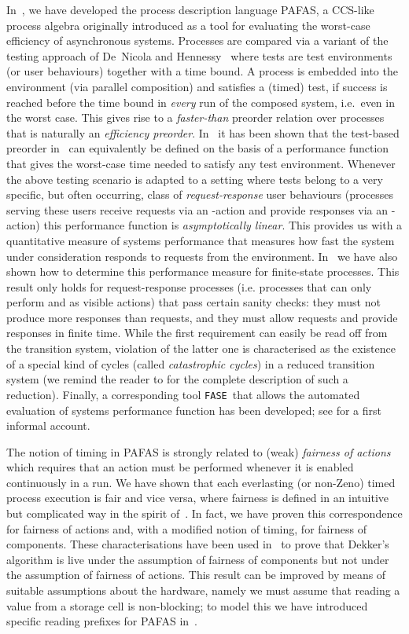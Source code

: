 \documentclass[copyright,creativecommons]{eptcs}
\newcommand{\fase}{\texttt{FASE}}
\begin{document}
In~\cite{CVJ02}, we have developed the process description language PAFAS,
a CCS-like~\cite{Mil89} process algebra  originally introduced as a tool
for evaluating the worst-case efficiency of asynchronous systems. Processes
are compared via a variant of the testing approach of De~Nicola and
Hennessy~\cite{DH84} where tests are test environments (or user behaviours)
together with a time bound. A process is embedded into the environment (via
parallel composition) and satisfies a (timed) test, if success is reached
before the time bound in {\em every} run of the composed system, i.e.\ even
in the worst case. This gives rise to a {\em faster-than} preorder relation
over processes that is naturally an {\it efficiency preorder}.
In~\cite{CV05} it has been shown that the test-based preorder
in~\cite{CVJ02} can equivalently be defined on the basis of a performance
function that gives the worst-case time needed to satisfy any test
environment. Whenever the above testing scenario is adapted to a setting
where tests belong to a very specific, but often occurring, class of {\em
request-response} user behaviours (processes serving these users receive
requests via an -action and provide responses via an -action) this
performance function is {\em asymptotically linear}. This provides us with
a quantitative measure of systems performance
that measures how fast the system under consideration responds to requests
from the environment. In~\cite{CV05} we have also shown how to determine
this performance measure for finite-state processes. This result only holds
for request-response processes (i.e. processes that can only perform 
and  as visible actions) that pass certain sanity checks: they must
not produce more responses than requests, and they must allow requests and
provide responses in finite time. While the first requirement can easily
be read off from the transition system, violation of the latter one
is characterised as the existence of a special kind of cycles (called
{\em catastrophic cycles}) in a reduced transition system (we remind the reader to \cite{CV05} for the complete description of such a reduction).
Finally, a corresponding tool \fase\ that allows the automated
evaluation of systems performance function has been developed; see
\cite{BCCDV09} for a first informal account. 

The notion of timing in PAFAS is strongly related to (weak) {\em fairness
of actions} which requires that an action must be performed whenever it is
enabled continuously in a run. We have shown that each everlasting (or
non-Zeno) timed process execution is fair and vice versa, where fairness is
defined in an intuitive but complicated way in the spirit
of~\cite{CostaS84,CostaS87}. In fact, we have proven this correspondence
for fairness of actions and, with a modified notion of timing, for fairness
of components. These characterisations have been used in~\cite{CDV06} to
prove that Dekker's algorithm is live under the assumption of fairness of components
but not under the assumption of fairness of actions. This result can be
improved by means of suitable assumptions about the hardware, namely we
must assume that reading a value from a storage cell is non-blocking; to
model this we have introduced specific reading prefixes for PAFAS
in~\cite{CDV08tr}. 
\end{document}
